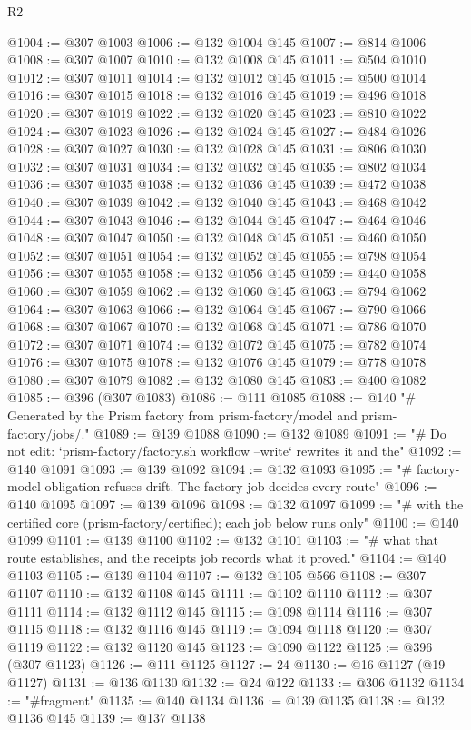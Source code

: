 \begin{lexlean}{R2}
\begin{coremodule}
@1004 := @307 @1003
@1006 := @132 @1004 @145
@1007 := @814 @1006
@1008 := @307 @1007
@1010 := @132 @1008 @145
@1011 := @504 @1010
@1012 := @307 @1011
@1014 := @132 @1012 @145
@1015 := @500 @1014
@1016 := @307 @1015
@1018 := @132 @1016 @145
@1019 := @496 @1018
@1020 := @307 @1019
@1022 := @132 @1020 @145
@1023 := @810 @1022
@1024 := @307 @1023
@1026 := @132 @1024 @145
@1027 := @484 @1026
@1028 := @307 @1027
@1030 := @132 @1028 @145
@1031 := @806 @1030
@1032 := @307 @1031
@1034 := @132 @1032 @145
@1035 := @802 @1034
@1036 := @307 @1035
@1038 := @132 @1036 @145
@1039 := @472 @1038
@1040 := @307 @1039
@1042 := @132 @1040 @145
@1043 := @468 @1042
@1044 := @307 @1043
@1046 := @132 @1044 @145
@1047 := @464 @1046
@1048 := @307 @1047
@1050 := @132 @1048 @145
@1051 := @460 @1050
@1052 := @307 @1051
@1054 := @132 @1052 @145
@1055 := @798 @1054
@1056 := @307 @1055
@1058 := @132 @1056 @145
@1059 := @440 @1058
@1060 := @307 @1059
@1062 := @132 @1060 @145
@1063 := @794 @1062
@1064 := @307 @1063
@1066 := @132 @1064 @145
@1067 := @790 @1066
@1068 := @307 @1067
@1070 := @132 @1068 @145
@1071 := @786 @1070
@1072 := @307 @1071
@1074 := @132 @1072 @145
@1075 := @782 @1074
@1076 := @307 @1075
@1078 := @132 @1076 @145
@1079 := @778 @1078
@1080 := @307 @1079
@1082 := @132 @1080 @145
@1083 := @400 @1082
@1085 := @396 (@307 @1083)
@1086 := @111 @1085
@1088 := @140 "# Generated by the Prism factory from prism-factory/model and prism-factory/jobs/."
@1089 := @139 @1088
@1090 := @132 @1089
@1091 := "# Do not edit: `prism-factory/factory.sh workflow --write` rewrites it and the"
@1092 := @140 @1091
@1093 := @139 @1092
@1094 := @132 @1093
@1095 := "# factory-model obligation refuses drift. The factory job decides every route"
@1096 := @140 @1095
@1097 := @139 @1096
@1098 := @132 @1097
@1099 := "# with the certified core (prism-factory/certified); each job below runs only"
@1100 := @140 @1099
@1101 := @139 @1100
@1102 := @132 @1101
@1103 := "# what that route establishes, and the receipts job records what it proved."
@1104 := @140 @1103
@1105 := @139 @1104
@1107 := @132 @1105 @566
@1108 := @307 @1107
@1110 := @132 @1108 @145
@1111 := @1102 @1110
@1112 := @307 @1111
@1114 := @132 @1112 @145
@1115 := @1098 @1114
@1116 := @307 @1115
@1118 := @132 @1116 @145
@1119 := @1094 @1118
@1120 := @307 @1119
@1122 := @132 @1120 @145
@1123 := @1090 @1122
@1125 := @396 (@307 @1123)
@1126 := @111 @1125
@1127 := 24
@1130 := @16 @1127 (@19 @1127)
@1131 := @136 @1130
@1132 := @24 @122
@1133 := @306 @1132
@1134 := "#fragment"
@1135 := @140 @1134
@1136 := @139 @1135
@1138 := @132 @1136 @145
@1139 := @137 @1138

\end{coremodule}
\end{lexlean}
